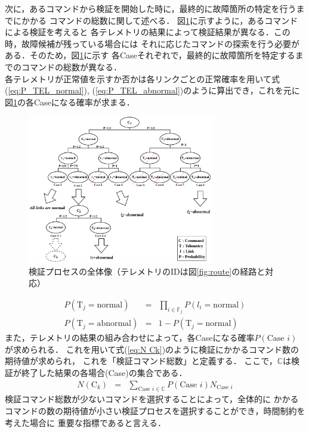 \documentclass[11pt]{jsarticle}%
\begin{document}
\begin{multicols}{2}
次に，あるコマンドから検証を開始した時に，最終的に故障箇所の特定を行うまでにかかる
コマンドの総数に関して述べる．
図\ref{fig:all_process}に示すように，あるコマンドによる検証を考えると
各テレメトリの結果によって検証結果が異なる．この時，故障候補が残っている場合には
それに応じたコマンドの探索を行う必要がある．そのため，図\ref{fig:all_process}に示す
各Caseそれぞれで，最終的に故障箇所を特定するまでのコマンドの総数が異なる．\\
各テレメトリが正常値を示すか否かは各リンクごとの正常確率を用いて式(\ref{eq:P_TEL_normal}),
(\ref{eq:P_TEL_abnormal})のように算出でき，これを元に図\ref{fig:all_process}の各Caseになる確率が求まる．
\vspace{-1zh}
\begin{figure}[H]
  \centering
    \includegraphics[height=6.5cm]{../figure/all_process.png}
    \caption{検証プロセスの全体像（テレメトリのIDは図\ref{fig:route}の経路と対応）}
    \label{fig:all_process}
\end{figure}
\vspace{-1zh}
\begin{eqnarray}
  P(\text{T}_j = \text{normal}) &=& \prod_{i\in\mathbb{F}_j} P(l_i = \text{normal}) \label{eq:P_TEL_normal}\\
  P(\text{T}_j = \text{abnormal}) &=& 1 - P(\text{T}_j = \text{normal}) \label{eq:P_TEL_abnormal}
\end{eqnarray}
また，テレメトリの結果の組み合わせによって，各Caseになる確率$P(\text{Case }i)$が求められる．
これを用いて式(\ref{eq:N Ck})のように検証にかかるコマンド数の期待値が求められ，
これを「検証コマンド総数」と定義する．
ここで，$\mathbb{C}$は検証が終了した結果の各場合(Case)の集合である．%
\begin{eqnarray}
  N(\text{C}_k) &=& \sum_{\text{Case }i\in\mathbb{C}} P(\text{Case }i) N_{\text{Case }i} \label{eq:N Ck}
\end{eqnarray}
検証コマンド総数が少ないコマンドを選択することによって，全体的に
かかるコマンドの数の期待値が小さい検証プロセスを選択することができ，時間制約を考えた場合に
重要な指標であると言える．
\vspace{-1zh}

\end{multicols}
\end{document}
